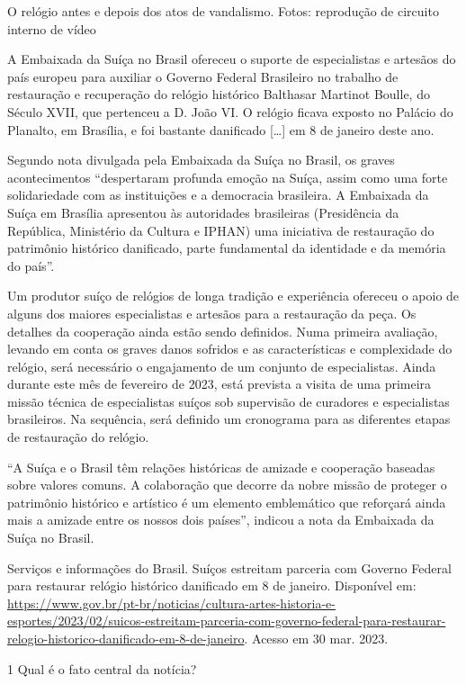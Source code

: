 \begin{itemize}
\begin{itemize}
O relógio antes e depois dos atos de vandalismo. Fotos: reprodução de
circuito interno de vídeo

A Embaixada da Suíça no Brasil ofereceu o suporte de especialistas e
artesãos do país europeu para auxiliar o Governo Federal Brasileiro no
trabalho de restauração e recuperação do relógio histórico Balthasar
Martinot Boulle, do Século XVII, que pertenceu a D. João VI. O relógio
ficava exposto no Palácio do Planalto, em Brasília, e foi bastante
danificado {[}\ldots{}{]} em 8 de janeiro deste ano.

Segundo nota divulgada pela Embaixada da Suíça no Brasil, os graves
acontecimentos ``despertaram profunda emoção na Suíça, assim como uma
forte solidariedade com as instituições e a democracia brasileira. A
Embaixada da Suíça em Brasília apresentou às autoridades brasileiras
(Presidência da República, Ministério da Cultura e IPHAN) uma iniciativa
de restauração do patrimônio histórico danificado, parte fundamental da
identidade e da memória do país''.

Um produtor suíço de relógios de longa tradição e experiência ofereceu o
apoio de alguns dos maiores especialistas e artesãos para a restauração
da peça. Os detalhes da cooperação ainda estão sendo definidos. Numa
primeira avaliação, levando em conta os graves danos sofridos e as
características e complexidade do relógio, será necessário o engajamento
de um conjunto de especialistas. Ainda durante este mês de fevereiro de
2023, está prevista a visita de uma primeira missão técnica de
especialistas suíços sob supervisão de curadores e especialistas
brasileiros. Na sequência, será definido um cronograma para as
diferentes etapas de restauração do relógio.

``A Suíça e o Brasil têm relações históricas de amizade e cooperação
baseadas sobre valores comuns. A colaboração que decorre da nobre missão
de proteger o patrimônio histórico e artístico é um elemento emblemático
que reforçará ainda mais a amizade entre os nossos dois países'',
indicou a nota da Embaixada da Suíça no Brasil.

Serviços e informações do Brasil. Suíços estreitam parceria com Governo
Federal para restaurar relógio histórico danificado em 8 de janeiro.
Disponível em:
\url{https://www.gov.br/pt-br/noticias/cultura-artes-historia-e-esportes/2023/02/suicos-estreitam-parceria-com-governo-federal-para-restaurar-relogio-historico-danificado-em-8-de-janeiro}.
Acesso em 30 mar. 2023.

\num{1} Qual é o fato central da notícia? 


\end{itemize}
\end{itemize}
